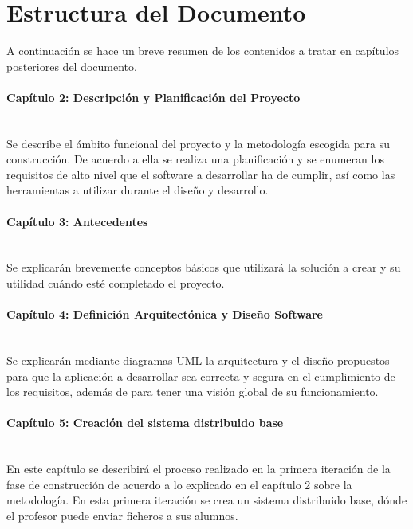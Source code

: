 \section{Estructura del Documento}
\label{sec:intr:organization}

A continuación se hace un breve resumen de los contenidos a tratar en capítulos posteriores del documento.

\paragraph{Capítulo 2: Descripción y Planificación del Proyecto} \ \\

Se describe el ámbito funcional del proyecto y la metodología escogida para su construcción. De acuerdo a ella se realiza una planificación y se enumeran los requisitos de alto nivel que el software a desarrollar ha de cumplir, así como las herramientas a utilizar durante el diseño y desarrollo.


\paragraph{Capítulo 3: Antecedentes} \ \\


Se explicarán brevemente conceptos básicos que utilizará la solución a crear y su utilidad cuándo esté completado el proyecto.


\paragraph{Capítulo 4: Definición Arquitectónica y Diseño Software} \ \\


Se explicarán mediante diagramas UML la arquitectura y el diseño propuestos para que la aplicación a desarrollar  sea correcta y segura en el cumplimiento de los requisitos, además de para tener una visión global de su funcionamiento.


\paragraph{Capítulo 5: Creación del sistema distribuido base} \ \\


En este capítulo se describirá el proceso realizado en la primera iteración de la fase de construcción de acuerdo a lo explicado en el capítulo 2 sobre la metodología. En esta primera iteración se crea un sistema distribuido base, dónde el profesor puede enviar ficheros a sus alumnos.


